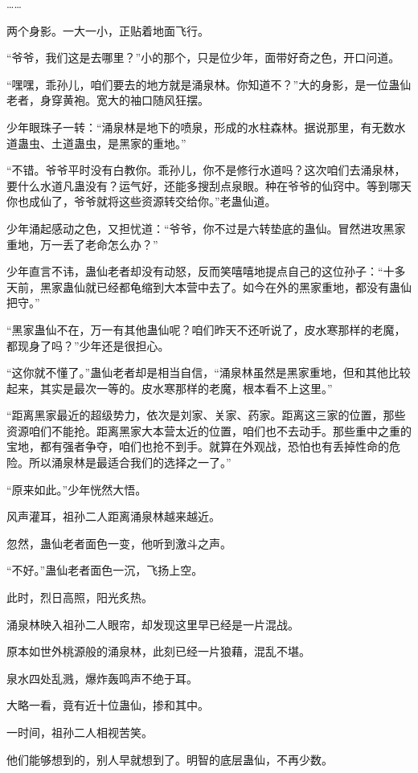 \begin{this_body}
……

两个身影。一大一小，正贴着地面飞行。

“爷爷，我们这是去哪里？”小的那个，只是位少年，面带好奇之色，开口问道。

“嘿嘿，乖孙儿，咱们要去的地方就是涌泉林。你知道不？”大的身影，是一位蛊仙老者，身穿黄袍。宽大的袖口随风狂摆。

少年眼珠子一转：“涌泉林是地下的喷泉，形成的水柱森林。据说那里，有无数水道蛊虫、土道蛊虫，是黑家的重地。”

“不错。爷爷平时没有白教你。乖孙儿，你不是修行水道吗？这次咱们去涌泉林，要什么水道凡蛊没有？运气好，还能多搜刮点泉眼。种在爷爷的仙窍中。等到哪天你也成仙了，爷爷就将这些资源转交给你。”老蛊仙道。

少年涌起感动之色，又担忧道：“爷爷，你不过是六转垫底的蛊仙。冒然进攻黑家重地，万一丢了老命怎么办？”

少年直言不讳，蛊仙老者却没有动怒，反而笑嘻嘻地提点自己的这位孙子：“十多天前，黑家蛊仙就已经都龟缩到大本营中去了。如今在外的黑家重地，都没有蛊仙把守。”

“黑家蛊仙不在，万一有其他蛊仙呢？咱们昨天不还听说了，皮水寒那样的老魔，都现身了吗？”少年还是很担心。

“这你就不懂了。”蛊仙老者却是相当自信，“涌泉林虽然是黑家重地，但和其他比较起来，其实是最次一等的。皮水寒那样的老魔，根本看不上这里。”

“距离黑家最近的超级势力，依次是刘家、关家、药家。距离这三家的位置，那些资源咱们不能抢。距离黑家大本营太近的位置，咱们也不去动手。那些重中之重的宝地，都有强者争夺，咱们也抢不到手。就算在外观战，恐怕也有丢掉性命的危险。所以涌泉林是最适合我们的选择之一了。”

“原来如此。”少年恍然大悟。

风声灌耳，祖孙二人距离涌泉林越来越近。

忽然，蛊仙老者面色一变，他听到激斗之声。

“不好。”蛊仙老者面色一沉，飞扬上空。

此时，烈日高照，阳光炙热。

涌泉林映入祖孙二人眼帘，却发现这里早已经是一片混战。

原本如世外桃源般的涌泉林，此刻已经一片狼藉，混乱不堪。

泉水四处乱溅，爆炸轰鸣声不绝于耳。

大略一看，竟有近十位蛊仙，掺和其中。

一时间，祖孙二人相视苦笑。

他们能够想到的，别人早就想到了。明智的底层蛊仙，不再少数。


\end{this_body}
